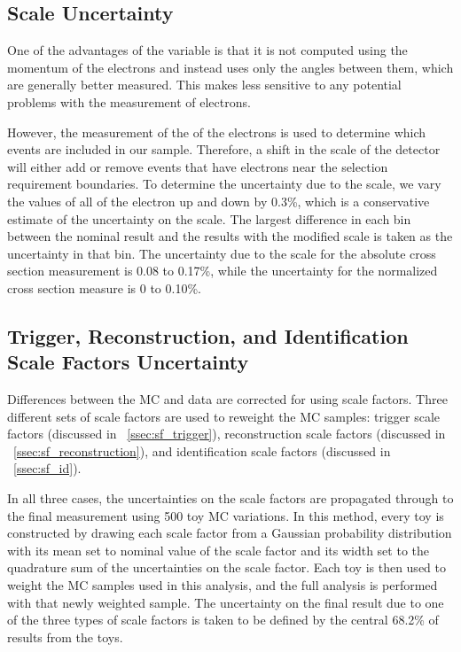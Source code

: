 \subsection{\texorpdfstring{\pt}{PT} Scale Uncertainty}
\label{ssec:pt_scale_uncertainty}

One of the advantages of the \phistar variable is that it is not computed using
the momentum of the electrons and instead uses only the angles between them,
which are generally better measured. This makes \phistar less sensitive to any
potential problems with the \pt measurement of electrons.

However, the measurement of the \pt of the electrons is used to determine which
events are included in our sample. Therefore, a shift in the \pt scale of the
detector will either add or remove events that have electrons near the \pt
selection requirement boundaries. To determine the uncertainty due to the \pt
scale, we vary the \pt values of all of the electron up and down by 0.3\%,
which is a conservative estimate of the uncertainty on the \pt scale. The
largest difference in each \phistar bin between the nominal result and the
results with the modified \pt scale is taken as the uncertainty in that bin.
The uncertainty due to the \pt scale for the absolute cross section measurement
is 0.08 to 0.17\%, while the uncertainty for the normalized cross section
measure is 0 to 0.10\%.

\subsection{Trigger, Reconstruction, and Identification Scale Factors Uncertainty}
\label{scale_factor_uncertainty}

Differences between the MC and data are corrected for using scale factors.
Three different sets of scale factors are used to reweight the MC samples:
trigger scale factors (discussed in \SEC~\ref{ssec:sf_trigger}), reconstruction
scale factors (discussed in \SEC~\ref{ssec:sf_reconstruction}), and
identification scale factors (discussed in \SEC~\ref{ssec:sf_id}).

In all three cases, the uncertainties on the scale factors are propagated
through to the final measurement using 500 toy MC variations. In this method,
every toy is constructed by drawing each scale factor from a Gaussian
probability distribution with its mean set to nominal value of the scale factor
and its width set to the quadrature sum of the uncertainties on the scale
factor. Each toy is then used to weight the MC samples used in this analysis,
and the full analysis is performed with that newly weighted sample. The
uncertainty on the final result due to one of the three types of scale factors
is taken to be defined by the central 68.2\% of results from the toys.

